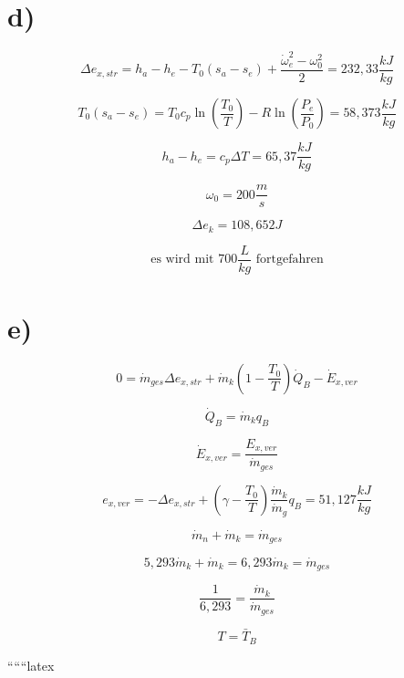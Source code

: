 

\section*{d)}

\[
\Delta e_{x, str} = h_a - h_e - T_0 (s_a - s_e) + \frac{\dot{\omega}_e^2 - \omega_0^2}{2} = 232,33 \frac{kJ}{kg}
\]

\[
T_0 (s_a - s_e) = T_0 c_p \ln \left( \frac{T_0}{T} \right) - R \ln \left( \frac{P_e}{P_0} \right) = 58,373 \frac{kJ}{kg}
\]

\[
h_a - h_e = c_p \Delta T = 65,37 \frac{kJ}{kg}
\]

\[
\omega_0 = 200 \frac{m}{s}
\]

\[
\Delta e_k = 108,652 J
\]

\[
\text{es wird mit } 700 \frac{L}{kg} \text{ fortgefahren}
\]

\section*{e)}

\[
0 = \dot{m}_{ges} \Delta e_{x, str} + \dot{m}_k \left( 1 - \frac{T_0}{T} \right) \dot{Q}_B - \dot{E}_{x, ver}
\]

\[
\dot{Q}_B = \dot{m}_k q_B
\]

\[
\dot{E}_{x, ver} = \frac{E_{x, ver}}{\dot{m}_{ges}}
\]

\[
e_{x, ver} = -\Delta e_{x, str} + \left( \gamma - \frac{T_0}{T} \right) \frac{\dot{m}_k}{\dot{m}_g} q_B = 51,127 \frac{kJ}{kg}
\]

\[
\dot{m}_n + \dot{m}_k = \dot{m}_{ges}
\]

\[
5,293 \dot{m}_k + \dot{m}_k = 6,293 \dot{m}_k = \dot{m}_{ges}
\]

\[
\frac{1}{6,293} = \frac{\dot{m}_k}{\dot{m}_{ges}}
\]

\[
T = \bar{T}_B
\]

``````latex